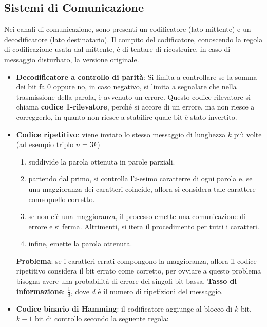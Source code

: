 \subsection{Sistemi di Comunicazione}
Nei canali di comunicazione, sono presenti un codificatore (lato mittente) e un decodificatore (lato destinatario). Il compito del codificatore, conoscendo la regola di codificazione usata dal mittente, è di tentare di ricostruire, in caso di messaggio disturbato, la versione originale.
\begin{itemize}[nosep]
    \item \textbf{Decodificatore a controllo di parità}: Si limita a controllare se la somma dei bit fa 0 oppure no, in caso negativo, si limita a segnalare che nella trasmissione della parola, è avvenuto un errore. Questo codice rilevatore si chiama \textbf{codice 1-rilevatore}, perché si accore di un errore, ma non riesce a correggerlo, in quanto non riesce a stabilire quale bit è stato invertito.
    \item \textbf{Codice ripetitivo}: viene inviato lo stesso messaggio di lunghezza $k$ più volte (ad esempio triplo $n = 3k$)
    \begin{enumerate}[nosep]
        \item suddivide la parola ottenuta in parole parziali.
        \item partendo dal primo, si controlla l'$i$-esimo caratterre di ogni parola e, se una maggioranza dei caratteri coincide, allora si considera tale carattere come quello corretto.
        \item se non c'è una maggioranza, il processo emette una comunicazione di errore e si ferma. Altrimenti, si itera il procedimento per tutti i caratteri.
        \item infine, emette la parola ottenuta.
    \end{enumerate}
    \textbf{Problema}: se i caratteri errati compongono la maggioranza, allora il codice ripetitivo considera il bit errato come corretto, per ovviare a questo problema bisogna avere una probabilità di errore dei singoli bit bassa. \textbf{Tasso di informazione}: $\frac{1}{d}$, dove $d$ è il numero di ripetizioni del messaggio.
    \item \textbf{Codice binario di Hamming}: il codificatore aggiunge al blocco di $k$ bit, $k - 1$ bit di controllo secondo la seguente regola:
    

\end{itemize}
